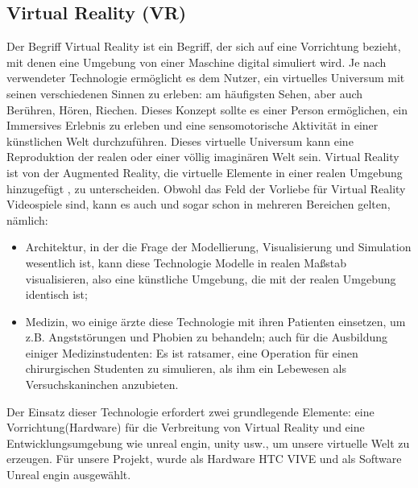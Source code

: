\subsection{Virtual Reality (VR)} \label{grund-vr}


Der Begriff Virtual Reality ist ein Begriff, der sich auf eine Vorrichtung bezieht, mit denen eine Umgebung von einer Maschine digital simuliert wird. 
Je nach verwendeter Technologie erm{\"o}glicht es dem Nutzer, ein virtuelles Universum mit seinen verschiedenen Sinnen zu erleben: 
am h{\"a}ufigsten Sehen, aber auch Ber{\"u}hren, H{\"o}ren, Riechen. 
Dieses Konzept sollte es einer Person erm{\"o}glichen, ein Immersives Erlebnis zu erleben und eine sensomotorische Aktivit{\"a}t in einer k{\"u}nstlichen Welt durchzuf{\"u}hren. 
Dieses virtuelle Universum kann eine Reproduktion der realen oder einer v{\"o}llig imagin{\"a}ren Welt sein. 
Virtual Reality ist von der Augmented Reality, die virtuelle Elemente in einer realen Umgebung hinzugef{\"u}gt , zu unterscheiden.
Obwohl das Feld der Vorliebe f{\"u}r Virtual Reality Videospiele sind, kann es auch und sogar schon in mehreren Bereichen gelten, n{\"a}mlich\cite{kolb18}:


\begin{itemize} \setlength\itemsep{-0.15cm}
  \item Architektur, in der die Frage der Modellierung, Visualisierung und Simulation wesentlich ist, kann diese Technologie Modelle in realen Ma{\ss}stab visualisieren, also eine k{\"u}nstliche Umgebung, die mit der realen Umgebung identisch ist;
  \item Medizin, wo einige {\"a}rzte diese Technologie mit ihren Patienten einsetzen, um z.B. Angstst{\"o}rungen und Phobien zu behandeln; auch f{\"u}r die Ausbildung einiger Medizinstudenten: Es ist ratsamer, eine Operation f{\"u}r einen chirurgischen Studenten zu simulieren, als ihm ein Lebewesen als Versuchskaninchen anzubieten.
\end{itemize}


Der Einsatz dieser Technologie erfordert zwei grundlegende Elemente: 
eine Vorrichtung(Hardware) f{\"u}r die Verbreitung von Virtual Reality und eine Entwicklungsumgebung wie unreal engin, unity usw., um unsere virtuelle Welt zu erzeugen. 
F{\"u}r unsere Projekt, wurde als Hardware HTC VIVE und als Software Unreal engin ausgew{\"a}hlt.




